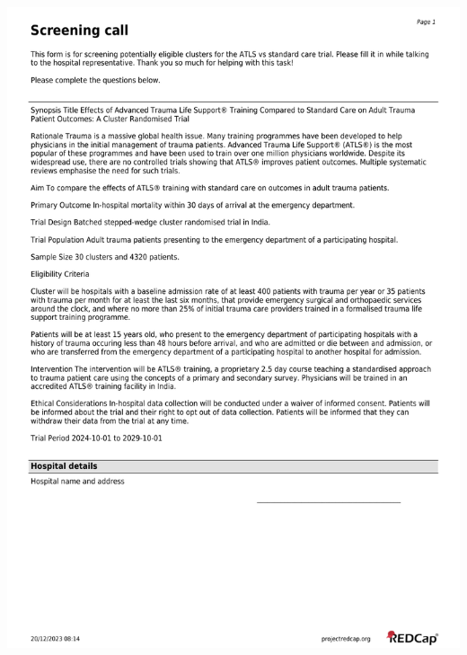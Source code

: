 \documentclass[
]{scrartcl}
\begin{document}
\includegraphics{./appendices/hospital-screening-instrument/hospital-screening-instrument-1.pdf}
\end{document}
